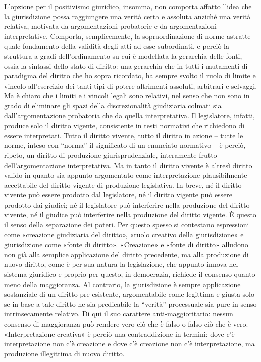 L’opzione per il positivismo giuridico, insomma, non comporta affatto l’idea che la giurisdizione possa raggiungere una verità certa e assoluta anziché una verità relativa, motivata da argomentazioni probatorie e da argomentazioni interpretative. Comporta, semplicemente, la sopraordinazione di norme astratte quale fondamento della validità degli atti ad esse subordinati, e perciò la struttura a gradi dell’ordinamento su cui è modellata la gerarchia delle fonti, ossia la sintassi dello stato di diritto: una gerarchia che in tutti i mutamenti di paradigma del diritto che ho sopra ricordato, ha sempre svolto il ruolo di limite e vincolo all’esercizio dei tanti tipi di potere altrimenti assoluti, arbitrari e selvaggi. Ma è chiaro che i limiti e i vincoli legali sono relativi, nel senso che non sono in grado di eliminare gli spazi della discrezionalità giudiziaria colmati sia dall’argomentazione probatoria che da quella interpretativa. Il legislatore, infatti, produce solo il diritto vigente, consistente in testi normativi che richiedono di essere interpretati. Tutto il diritto vivente, tutto il diritto in azione – tutte le norme, inteso con “norma” il significato di un enunciato normativo – è perciò, ripeto, un diritto di produzione giurisprudenziale, interamente frutto dell’argomentazione interpretativa. Ma in tanto il diritto vivente è altresì diritto valido in quanto sia appunto argomentato come interpretazione plausibilmente accettabile del diritto vigente di produzione legislativa. In breve, né il diritto vivente può essere prodotto dal legislatore, né il diritto vigente può essere prodotto dai giudici; né il legislatore può interferire nella produzione del diritto vivente, né il giudice può interferire nella produzione del diritto vigente. È questo il senso della separazione dei poteri.
Per questo spesso si contestano espressioni come «creazione giudiziaria del diritto», «ruolo creativo della giurisdizione» e giurisdizione come «fonte di diritto». «Creazione» e «fonte di diritto» alludono non già alla semplice applicazione del diritto precedente, ma alla produzione di nuovo diritto, come è per sua natura la legislazione, che appunto innova nel sistema giuridico e proprio per questo, in democrazia, richiede il consenso quanto meno della maggioranza. Al contrario, la giurisdizione è sempre applicazione sostanziale di un diritto pre-esistente, argomentabile come legittima e giusta solo se in base a tale diritto ne sia predicabile la “verità” processuale sia pure in senso intrinsecamente relativo. Di qui il suo carattere anti-maggioritario: nessun consenso di maggioranza può rendere vero ciò che è falso o falso ciò che è vero. «Interpretazione creativa» è perciò una contraddizione in termini: dove c’è interpretazione non c’è creazione e dove c’è creazione non c’è interpretazione, ma produzione illegittima di nuovo diritto. 
